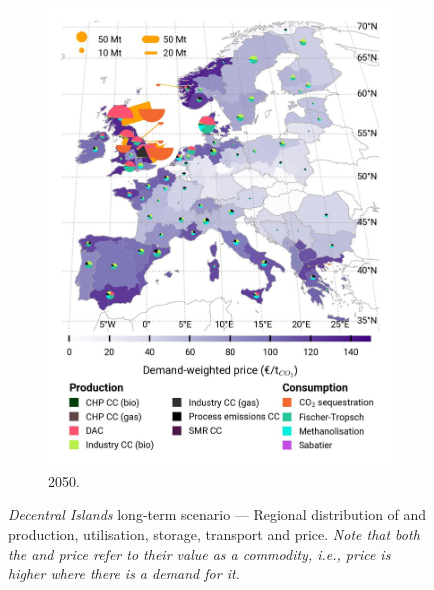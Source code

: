 \documentclass[preprint,12pt,sort&compress]{elsarticle}
\begin{document}
\begin{figure}[htbp]
\begin{subfigure}[t]{0.33\textwidth}
      \includegraphics[width=1\textwidth]{maps/no-pipelines-no-pcipmi/base_s_adm___2050-balance_map_co2_stored} 
      \caption{ 2050.}
      \label{fig:DI_lt_2050_co2}
  \end{subfigure}
  \vspace{0.3cm}
  \caption{\textit{Decentral Islands} long-term scenario --- Regional distribution of  and  production, utilisation, storage, transport and price. \textit{Note that both the  and  price refer to their value as a commodity, i.e., price is higher where there is a demand for it.}}
  \label{fig:DI_lt}
\end{figure}
\end{document}
